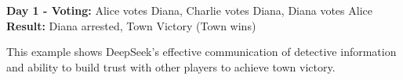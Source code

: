 \documentclass{article}
\begin{document}
\begin{resultbox}
\textbf{Day 1 - Voting:} Alice votes Diana, Charlie votes Diana, Diana votes Alice\\
\textbf{Result:} Diana arrested, Town Victory (Town wins)
\end{resultbox}

This example shows DeepSeek's effective communication of detective information and ability to build trust with other players to achieve town victory.
\end{document}
